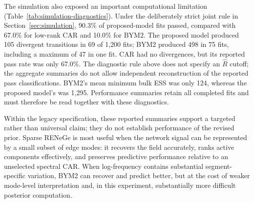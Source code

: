 \documentclass[11pt]{article}
\begin{document}
The simulation also exposed an important computational limitation (Table~\ref{tab:simulation-diagnostics}). Under the deliberately strict joint rule in Section~\ref{sec:simulation}, 90.3\% of proposed-model fits passed, compared with 67.0\% for low-rank CAR and 10.0\% for BYM2. The proposed model produced 105 divergent transitions in 69 of 1,200 fits; BYM2 produced 498 in 75 fits, including a maximum of 47 in one fit. CAR had no divergences, but its reported pass rate was only 67.0\%. The diagnostic rule above does not specify an $\widehat R$ cutoff; the aggregate summaries do not allow independent reconstruction of the reported pass classifications. BYM2's mean minimum bulk ESS was only 124, whereas the proposed model's was 1,295. Performance summaries retain all completed fits and must therefore be read together with these diagnostics.  

\begin{table}[!tbp]
  \centering
  \small
  \caption{Computational performance across 1,200 fits per model. Pass rate uses the joint diagnostic criterion defined above. Divergent fits counts fits with at least one divergence.}
  \label{tab:simulation-diagnostics}
\end{table}

Within the legacy specification, these reported summaries support a targeted rather than universal claim; they do not establish performance of the revised prior. Sparse RENeGe is most useful when the network signal can be represented by a small subset of edge modes: it recovers the field accurately, ranks active components effectively, and preserves predictive performance relative to an unselected spectral CAR. When log-frequency contains substantial segment-specific variation, BYM2 can recover and predict better, but at the cost of weaker mode-level interpretation and, in this experiment, substantially more difficult posterior computation.
\end{document}
